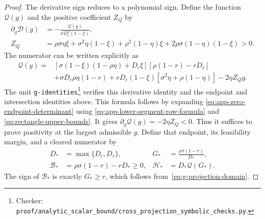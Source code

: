 \documentclass[11pt]{article}
\theoremstyle{remark}
\theoremstyle{plain}
\begin{document}
\begin{proof}
The derivative sign reduces to a polynomial sign.
Define the function $\mathcal Q(g)$ and the positive coefficient $Z_Q$ by
\begin{equation}
 \begin{aligned}
 \partial_g\mathcal D(g)
    &=-\frac{\mathcal Q(g)}{\sigma D_c^2(1-\xi)},\\
 Z_Q&=\rho\sigma\eta\xi+\sigma^2\eta(1-\xi)
       +\rho^2(1-\eta)\xi+2\rho\sigma(1-\eta)(1-\xi)>0.
 \end{aligned}
 \label{eq:app-determinant-derivative-numerator}
\end{equation}
The numerator can be written explicitly as
\begin{equation}
 \begin{aligned}
 \mathcal Q(g)={}&
 [\sigma(1-\xi)(1-\rho\eta)+D_c\xi]
                   [\rho(1-r)-rD_c]\\
 &+\sigma D_c\rho\eta(1-r)
       +rD_c(1-\xi)[\sigma^2\eta+\rho(1-\eta)]
       -2\eta Z_Q g .
 \end{aligned}
 \label{eq:app-determinant-numerator-polynomial}
\end{equation}
The unit \nolinkurl{g-identities}\footnote{Checker:
\nolinkurl{proof/analytic_scalar_bound/cross_projection_symbolic_checks.py}.\label{fn:checker-g-identities}} verifies this derivative
identity and the endpoint and intersection identities above.
This formula follows by expanding
\eqref{eq:app-zero-endpoint-determinant} using
\eqref{eq:app-lower-segment-row-formula} and
\eqref{eq:rectangle-upper-bounds}.
It gives $\partial_g\mathcal Q(g)=-2\eta Z_Q<0$.
Thus it suffices to prove positivity at the largest admissible $g$.
Define that endpoint, its feasibility margin, and a cleared numerator by
\begin{equation}
 \begin{aligned}
 D_*&=\max\{D_c,D_r\},&
 G_*&=\frac{\rho\sigma(1-r)}{D_*},\\
 \mathcal B_*&=\rho\sigma(1-r)-rD_*\ge0,&
 \mathcal H_*&=D_*\mathcal Q(G_*).
 \end{aligned}
 \label{eq:app-g-upper-endpoint}
\end{equation}
The sign of $\mathcal B_*$ is exactly $G_*\ge r$, which follows
from~\eqref{eq:g-projection-domain}.


\end{proof}
\end{document}
